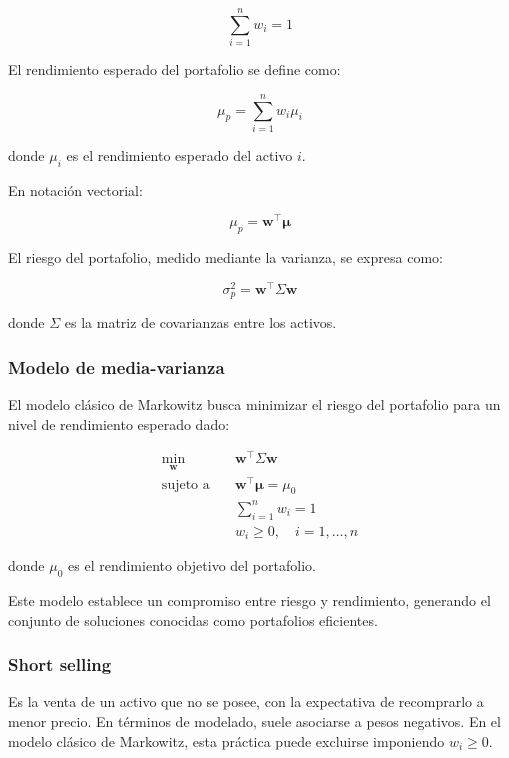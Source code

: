 \documentclass[12pt]{article}
\begin{document}
\begin{equation}
  \sum_{i=1}^{n} w_i = 1
\end{equation}

El rendimiento esperado del portafolio se define como:

\begin{equation}
  \mu_p = \sum_{i=1}^{n} w_i \mu_i
\end{equation}

donde $\mu_i$ es el rendimiento esperado del activo $i$.

En notación vectorial:

\begin{equation}
  \mu_p = \mathbf{w}^{\top}\boldsymbol{\mu}
\end{equation}

El riesgo del portafolio, medido mediante la varianza, se expresa como:

\begin{equation}
  \sigma_p^2 = \mathbf{w}^{\top}\Sigma\mathbf{w}
\end{equation}

donde $\Sigma$ es la matriz de covarianzas entre los activos.

\subsubsection{Modelo de media-varianza}

El modelo clásico de Markowitz busca minimizar el riesgo del portafolio
para un nivel de rendimiento esperado dado:

\begin{align}
  \min_{\mathbf{w}} \quad & \mathbf{w}^{\top}\Sigma\mathbf{w} \\
  \text{sujeto a} \quad & \mathbf{w}^{\top}\boldsymbol{\mu} = \mu_0 \\
  & \sum_{i=1}^{n} w_i = 1 \\
  & w_i \geq 0, \quad i = 1, \dots, n
\end{align}

donde $\mu_0$ es el rendimiento objetivo del portafolio.

Este modelo establece un compromiso entre riesgo y rendimiento,
generando el conjunto de soluciones conocidas como portafolios eficientes.

\subsubsection{Short selling}
Es la venta de un activo que no se posee, con la expectativa de
recomprarlo a menor precio. En términos de modelado, suele asociarse a
pesos negativos. En el modelo clásico de Markowitz, esta práctica
puede excluirse imponiendo $w_i \ge 0$.
\end{document}
